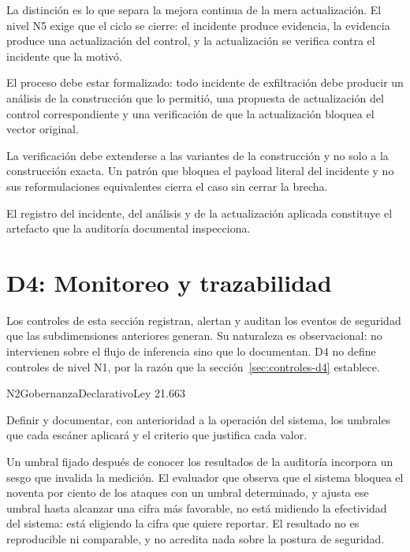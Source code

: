 La distinción es lo que separa la mejora continua de la mera actualización. El nivel N5 exige que el ciclo se cierre: el incidente produce evidencia, la evidencia produce una actualización del control, y la actualización se verifica contra el incidente que la motivó.

El proceso debe estar formalizado: todo incidente de exfiltración debe producir un análisis de la construcción que lo permitió, una propuesta de actualización del control correspondiente y una verificación de que la actualización bloquea el vector original.

La verificación debe extenderse a las variantes de la construcción y no solo a la construcción exacta. Un patrón que bloquea el payload literal del incidente y no sus reformulaciones equivalentes cierra el caso sin cerrar la brecha.

El registro del incidente, del análisis y de la actualización aplicada constituye el artefacto que la auditoría documental inspecciona.


\section{D4: Monitoreo y trazabilidad}
\label{sec:fichas-d4}

Los controles de esta sección registran, alertan y auditan los eventos de seguridad que las subdimensiones anteriores generan. Su naturaleza es observacional: no intervienen sobre el flujo de inferencia sino que lo documentan. D4 no define controles de nivel N1, por la razón que la sección~\ref{sec:controles-d4} establece.

  {N2}{Gobernanza}{Declarativo}{Ley 21.663}

Definir y documentar, con anterioridad a la operación del sistema, los umbrales que cada escáner aplicará y el criterio que justifica cada valor.

Un umbral fijado después de conocer los resultados de la auditoría incorpora un sesgo que invalida la medición. El evaluador que observa que el sistema bloquea el noventa por ciento de los ataques con un umbral determinado, y ajusta ese umbral hasta alcanzar una cifra más favorable, no está midiendo la efectividad del sistema: está eligiendo la cifra que quiere reportar. El resultado no es reproducible ni comparable, y no acredita nada sobre la postura de seguridad.

